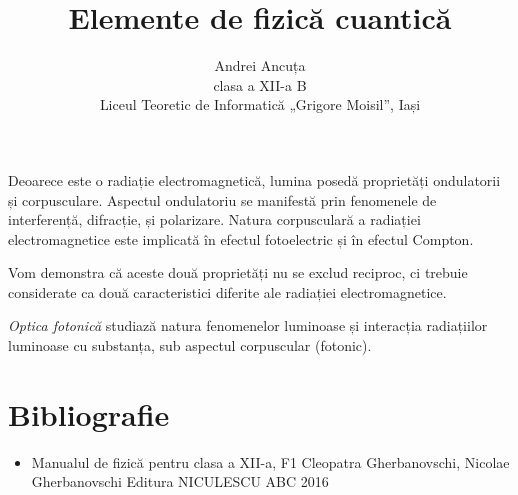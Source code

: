 \documentclass[a4paper, 12pt]{article}
\title{Elemente de fizică cuantică}
\author{Andrei Ancuța \\ clasa a XII-a B \\
Liceul Teoretic de Informatică „Grigore Moisil”, Iași}
\def\\{}%
\newcommand{\mktitle}{%
    \noindent
    {\small\theauthor}

    \begin{center}
        \LARGE\thetitle
    \end{center}
}
\newcommand{\parbreak}{\vspace{1cm}}
\begin{document}
\mktitle
\tableofcontents

\parbreak

Deoarece este o radiație electromagnetică, lumina posedă proprietăți
ondulatorii și corpusculare. Aspectul ondulatoriu se manifestă prin
fenomenele de interferență, difracție, și polarizare. Natura corpusculară
a radiației electromagnetice este implicată în efectul fotoelectric și în
efectul Compton.

Vom demonstra că aceste două proprietăți nu se exclud reciproc, ci
trebuie considerate ca două caracteristici diferite ale radiației
electromagnetice.

\emph{Optica fotonică} studiază natura fenomenelor luminoase și interacția
radiațiilor luminoase cu substanța, sub aspectul corpuscular (fotonic).




\clearpage

\section*{Bibliografie}
\begin{itemize}
    \item Manualul de fizică pentru clasa a XII-a, F1 \\
        Cleopatra Gherbanovschi, Nicolae Gherbanovschi \\
        Editura NICULESCU ABC \\
        2016
\end{itemize}
\end{document}
